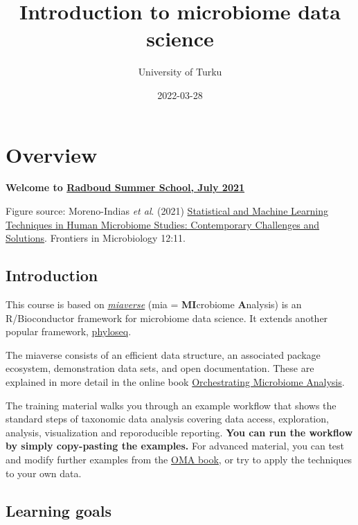 \documentclass[
  oneside]{book}
\title{Introduction to microbiome data science}
\author{University of Turku}
\date{2022-03-28}
\begin{document}
\maketitle

{
\setcounter{tocdepth}{1}
\tableofcontents
}
\hypertarget{overview}{%
\chapter{Overview}\label{overview}}

\textbf{Welcome to \href{https://www.ru.nl/radboudsummerschool/courses/2021/brain-bacteria-behaviour/}{Radboud Summer School, July 2021}}

Figure source: Moreno-Indias \emph{et al}. (2021) \href{https://doi.org/10.3389/fmicb.2021.635781}{Statistical and Machine Learning Techniques in Human Microbiome Studies: Contemporary Challenges and Solutions}. Frontiers in Microbiology 12:11.

\hypertarget{introduction}{%
\section{Introduction}\label{introduction}}

This course is based on \href{https://microbiome.github.io}{\emph{miaverse}} (mia = \textbf{MI}crobiome \textbf{A}nalysis) is an
R/Bioconductor framework for microbiome data science. It extends another popular framework, \href{https://joey711.github.io/phyloseq/}{phyloseq}.

The miaverse consists of an efficient data structure, an
associated package ecosystem, demonstration data sets, and open
documentation. These are explained in more detail in the online book
\href{https://microbiome.github.io/OMA}{Orchestrating Microbiome Analysis}.

The training material walks you through an example workflow that
shows the standard steps of taxonomic data analysis covering data
access, exploration, analysis, visualization and reporoducible
reporting. \textbf{You can run the workflow by simply copy-pasting the
examples.} For advanced material, you can test and modify further
examples from the \href{https://microbiome.github.io/OMA}{OMA book}, or try
to apply the techniques to your own data.

\hypertarget{learning-goals}{%
\section{Learning goals}\label{learning-goals}}
\end{document}
